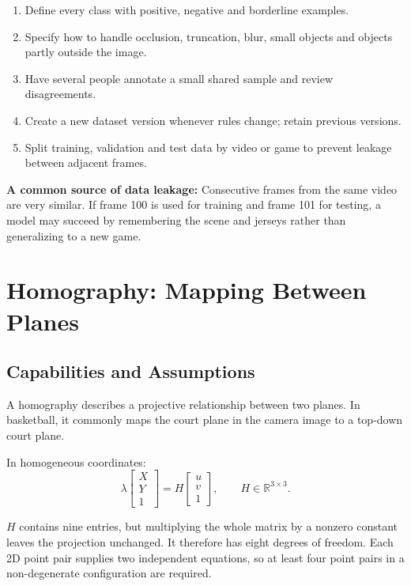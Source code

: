 \documentclass[11pt,a4paper,oneside]{report}
\begin{document}
\begin{enumerate}
  \item Define every class with positive, negative and borderline examples.
  \item Specify how to handle occlusion, truncation, blur, small objects and objects partly outside the image.
  \item Have several people annotate a small shared sample and review disagreements.
  \item Create a new dataset version whenever rules change; retain previous versions.
  \item Split training, validation and test data by video or game to prevent leakage between adjacent frames.
\end{enumerate}

\begin{riskBox}
\textbf{A common source of data leakage:}\quad
Consecutive frames from the same video are very similar. If frame 100 is used for training and frame 101 for testing, a model may succeed by remembering the scene and jerseys rather than generalizing to a new game.
\end{riskBox}

\section{Homography: Mapping Between Planes}

\subsection{Capabilities and Assumptions}

A homography describes a projective relationship between two planes. In basketball, it commonly maps the court plane in the camera image to a top-down court plane.

In homogeneous coordinates:
\[
\lambda
\begin{bmatrix}X\\Y\\1\end{bmatrix}
=
H
\begin{bmatrix}u\\v\\1\end{bmatrix},
\qquad
H\in\mathbb{R}^{3\times 3}.
\]

$H$ contains nine entries, but multiplying the whole matrix by a nonzero constant leaves the projection unchanged. It therefore has eight degrees of freedom. Each 2D point pair supplies two independent equations, so at least four point pairs in a non-degenerate configuration are required.
\end{document}

